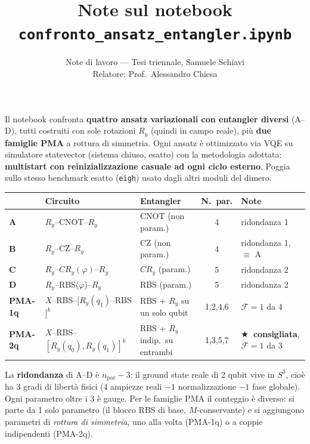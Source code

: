 \documentclass[11pt,a4paper]{article}
\title{\vspace{-1.5em}\color{inkblue}Note sul notebook\\[0.1em]\texttt{confronto\_ansatz\_entangler.ipynb}}
\author{Note di lavoro --- Tesi triennale, Samuele Schiavi\\ Relatore: Prof.\ Alessandro Chiesa}
\date{}
\begin{document}
\sloppy
\maketitle
\thispagestyle{fancy}
\vspace{-2em}

Il notebook confronta \textbf{quattro ansatz variazionali con entangler
diversi} (A--D), tutti costruiti con sole rotazioni $R_y$ (quindi in
campo reale), più \textbf{due famiglie PMA} a rottura di simmetria. Ogni
ansatz è ottimizzato via VQE su simulatore statevector (sistema chiuso,
esatto) con la metodologia adottata: \textbf{multistart con
reinizializzazione casuale ad ogni ciclo esterno}. Poggia sullo stesso
benchmark esatto (\texttt{eigh}) usato dagli altri moduli del dimero.

\begin{center}
\renewcommand{\arraystretch}{1.3}
\small
\begin{tabular}{@{}lp{3.0cm}p{2.6cm}cp{2.6cm}@{}}
\toprule
\rowcolor{inkblue!10}
 & \textbf{Circuito} & \textbf{Entangler} & \textbf{N.\ par.} & \textbf{Note}\\
\midrule
\textbf{A} & $R_y$--CNOT--$R_y$ & CNOT (non param.) & 4 & ridondanza 1\\
\textbf{B} & $R_y$--CZ--$R_y$ & CZ (non param.) & 4 & ridondanza 1, $\equiv$ A\\
\textbf{C} & $R_y$--$CR_y(\varphi)$--$R_y$ & $CR_y$ (param.) & 5 & ridondanza 2\\
\textbf{D} & $R_y$--RBS($\varphi$)--$R_y$ & RBS (param.) & 5 & ridondanza 2\\
\textbf{PMA-1q} & $X$--RBS--$[R_y(q_1)$--RBS$]^k$ & RBS + $R_y$ su un solo qubit & 1,2,4,6 & $\mathcal F{=}1$ da 4\\
\textbf{PMA-2q} & $X$--RBS--$[R_y(q_0),R_y(q_1)]^k$ & RBS + $R_y$ indip.\ su entrambi & 1,3,5,7 & \textbf{$\bigstar$\ consigliata}, $\mathcal F{=}1$ da 3\\
\bottomrule
\end{tabular}
\end{center}

La \textbf{ridondanza} di A--D è $n_\text{par}-3$: il ground state reale
di 2 qubit vive in $S^3$, cioè ha 3 gradi di libertà fisici (4 ampiezze
reali $-1$ normalizzazione $-1$ fase globale). Ogni parametro oltre i 3
è gauge. Per le famiglie PMA il conteggio è diverso: si parte da 1 solo
parametro (il blocco RBS di base, $M$-conservante) e si aggiungono
parametri di \emph{rottura di simmetria}, uno alla volta (PMA-1q) o a
coppie indipendenti (PMA-2q).
\end{document}

